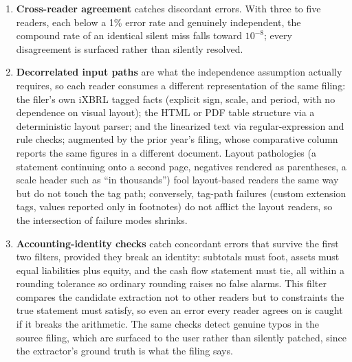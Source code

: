 \documentclass[11pt]{article}
\begin{document}
\begin{enumerate}
  \item \textbf{Cross-reader agreement} catches discordant errors. With three to five readers, each below a 1\% error rate and genuinely independent, the compound rate of an identical silent miss falls toward $10^{-8}$; every disagreement is surfaced rather than silently resolved.
  \item \textbf{Decorrelated input paths} are what the independence assumption actually requires, so each reader consumes a different representation of the same filing: the filer's own iXBRL tagged facts (explicit sign, scale, and period, with no dependence on visual layout); the HTML or PDF table structure via a deterministic layout parser; and the linearized text via regular-expression and rule checks; augmented by the prior year's filing, whose comparative column reports the same figures in a different document. Layout pathologies (a statement continuing onto a second page, negatives rendered as parentheses, a scale header such as ``in thousands'') fool layout-based readers the same way but do not touch the tag path; conversely, tag-path failures (custom extension tags, values reported only in footnotes) do not afflict the layout readers, so the intersection of failure modes shrinks.
  \item \textbf{Accounting-identity checks} catch concordant errors that survive the first two filters, provided they break an identity: subtotals must foot, assets must equal liabilities plus equity, and the cash flow statement must tie, all within a rounding tolerance so ordinary rounding raises no false alarms. This filter compares the candidate extraction not to other readers but to constraints the true statement must satisfy, so even an error every reader agrees on is caught if it breaks the arithmetic. The same checks detect genuine typos in the source filing, which are surfaced to the user rather than silently patched, since the extractor's ground truth is what the filing says.
\end{enumerate}
\end{document}
